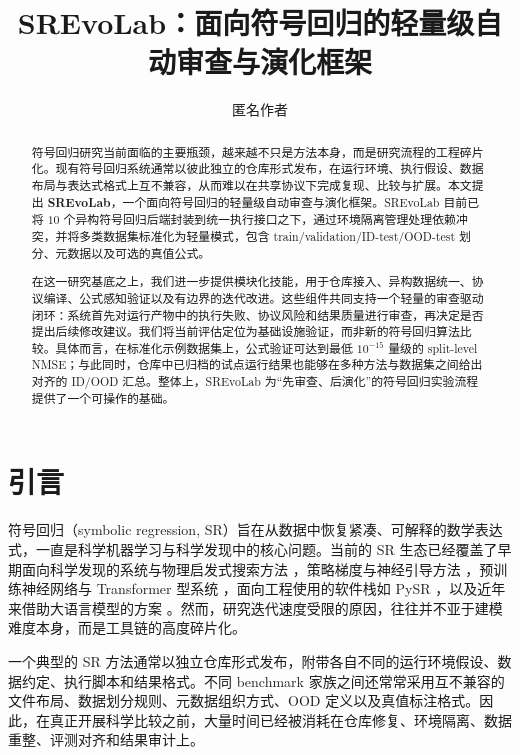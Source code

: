 \documentclass[UTF8]{ctexart}
\title{SREvoLab：面向符号回归的轻量级自动审查与演化框架}
\author{匿名作者}
\date{}
\begin{document}
\maketitle

\begin{abstract}
符号回归研究当前面临的主要瓶颈，越来越不只是方法本身，而是研究流程的工程碎片化。现有符号回归系统通常以彼此独立的仓库形式发布，在运行环境、执行假设、数据布局与表达式格式上互不兼容，从而难以在共享协议下完成复现、比较与扩展。本文提出 \textbf{SREvoLab}，一个面向符号回归的轻量级自动审查与演化框架。SREvoLab 目前已将 $10$ 个异构符号回归后端封装到统一执行接口之下，通过环境隔离管理处理依赖冲突，并将多类数据集标准化为轻量模式，包含 train/validation/ID-test/OOD-test 划分、元数据以及可选的真值公式。

在这一研究基底之上，我们进一步提供模块化技能，用于仓库接入、异构数据统一、协议编译、公式感知验证以及有边界的迭代改进。这些组件共同支持一个轻量的审查驱动闭环：系统首先对运行产物中的执行失败、协议风险和结果质量进行审查，再决定是否提出后续修改建议。我们将当前评估定位为基础设施验证，而非新的符号回归算法比较。具体而言，在标准化示例数据集上，公式验证可达到最低 $10^{-15}$ 量级的 split-level NMSE；与此同时，仓库中已归档的试点运行结果也能够在多种方法与数据集之间给出对齐的 ID/OOD 汇总。整体上，SREvoLab 为“先审查、后演化”的符号回归实验流程提供了一个可操作的基础。
\end{abstract}

\section{引言}

符号回归（symbolic regression, SR）旨在从数据中恢复紧凑、可解释的数学表达式，一直是科学机器学习与科学发现中的核心问题。当前的 SR 生态已经覆盖了早期面向科学发现的系统与物理启发式搜索方法 \citep{schmidt2009distilling,udrescu2020aifeynman,udrescu2020aifeynman2}，策略梯度与神经引导方法 \citep{petersen2021deep,mundhenk2021seeding}，预训练神经网络与 Transformer 型系统 \citep{biggio2021nsr,valipour2021symbolicgpt,kamienny2022end,vastl2022symformer,tpsr2023}，面向工程使用的软件栈如 PySR \citep{cranmer2023pysr}，以及近年来借助大语言模型的方案 \citep{shojaee2024llm,wang2025drsr}。然而，研究迭代速度受限的原因，往往并不亚于建模难度本身，而是工具链的高度碎片化。

一个典型的 SR 方法通常以独立仓库形式发布，附带各自不同的运行环境假设、数据约定、执行脚本和结果格式。不同 benchmark 家族之间还常常采用互不兼容的文件布局、数据划分规则、元数据组织方式、OOD 定义以及真值标注格式。因此，在真正开展科学比较之前，大量时间已经被消耗在仓库修复、环境隔离、数据重整、评测对齐和结果审计上。
\end{document}
